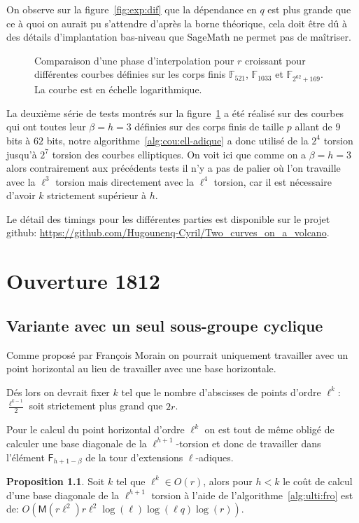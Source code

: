 \documentclass[10pt,a4paper]{book}
\theoremstyle{plain}
\theoremstyle{definition}
\theoremstyle{definition}
\theoremstyle{definition}
\newtheorem{prop}[thm]{Proposition}
\theoremstyle{definition}
\theoremstyle{remark}
\theoremstyle{remark}
\theoremstyle{definition}
\begin{document}
On observe sur la figure~\ref{fig:exp:dif} que la dépendance en $q$ est plus 
grande que ce à quoi on aurait pu s'attendre d'après la borne théorique, cela 
doit être dû à des détails d'implantation bas-niveau que SageMath ne permet pas
de maîtriser.

\begin{figure}
\label{fig:exp:niv}
%
\caption{Comparaison d'une phase d'interpolation pour $r$ croissant pour différentes courbes définies sur les corps finis $\mathbb{F}_{521}$, $\mathbb{F}_{1033}$ et $\mathbb{F}_{2^{62}+169 }$. La courbe est en échelle logarithmique.}
\end{figure}

La deuxième série de tests montrés sur la figure~\ref{fig:exp:niv} a été réalisé
sur des courbes qui ont toutes leur $\beta=h=3$ définies sur des corps finis de
taille $p$ allant de $9$ bits à $62$ bits, notre algorithme~\ref{alg:cou:ell-adique} a donc utilisé de la 
$2^4$ torsion jusqu'à $2^7$ torsion des courbes elliptiques. On voit ici que comme on a 
$\beta=h=3$ alors contrairement aux précédents tests il n'y a pas de palier où l'on travaille avec la 
$\ell^{3}$ torsion mais directement avec la $\ell^4$ torsion, car il est 
nécessaire d'avoir $k$ strictement supérieur à $h$.

Le détail des timings pour les 
différentes parties est disponible sur le projet github: 
\url{https://github.com/Hugounenq-Cyril/Two_curves_on_a_volcano}. 
\chapter{Ouverture 1812}
\section{Variante avec un seul sous-groupe cyclique}
Comme proposé par François Morain on pourrait uniquement travailler avec un 
point horizontal au lieu de travailler avec une base horizontale.

Dés lors on devrait fixer $k$ tel que le nombre d'abscisses de points d'ordre 
$\ell^k:$ $\frac{\ell^{k-1}}{2}$ soit strictement plus grand que $2r$.

Pour le calcul du point horizontal d'ordre $\ell^k$ on est tout de même obligé 
de calculer une base diagonale de la $\ell^{h+1}$-torsion et donc de 
travailler dans l'élément $\mathsf{F}_{h+1-\beta}$ de la tour d'extensions 
$\ell$-adiques.

\begin{prop}
Soit $k$ tel que $\ell^k \in O(r)$, alors pour $h<k$ le coût de calcul d'une 
base diagonale de la $\ell^{h+1}$ torsion à l'aide de 
l'algorithme~\ref{alg:ulti:fro} est de:
$O(\mathsf{M}(r\ell^2)r\ell^2\log(\ell)\log(\ell q) \log(r))$.
\end{prop}
\end{document}
